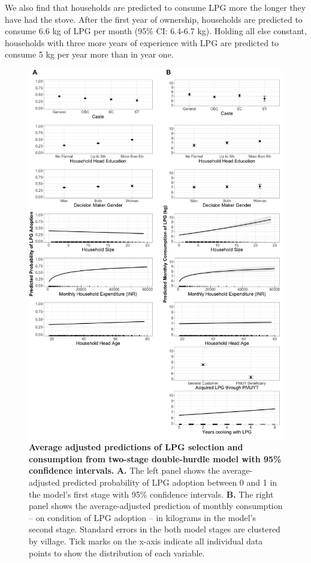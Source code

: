 \documentclass[11pt,english]{article}
\theoremstyle{plain} \newtheorem{claim}{Claim}
\theoremstyle{plain} \newtheorem{prop}{Proposition}
\theoremstyle{plain} \newtheorem{hypo}{Hypothesis}
\begin{document}
We also find that households are predicted to consume LPG more the longer they have had the stove. After the first year of ownership, households are predicted to consume 6.6 kg of LPG per month (95\% CI: 6.4-6.7 kg). Holding all else constant, households with three more years of experience with LPG are predicted to consume 5 kg per year more than in year one.


\begin{figure}[h!]
	\centering
	\includegraphics[scale=0.38]{Figures/Marginal_Effects/churdle_ME_option2_rugs.png}
	\caption{\textbf{Average adjusted predictions of LPG selection and consumption from two-stage double-hurdle model with 95\% confidence intervals.}  \textbf{A.} The left panel shows the average-adjusted predicted probability of LPG adoption between 0 and 1 in the model's first stage with 95\% confidence intervals. \textbf{B.} The right panel shows the average-adjusted prediction of monthly consumption -- on condition of LPG adoption -- in kilograms in the model's second stage. Standard errors in the both model stages are clustered by village. Tick marks on the x-axis indicate all individual data points to show the distribution of each variable.} 
	\label{churdle_ME}
\end{figure}
\end{document}
